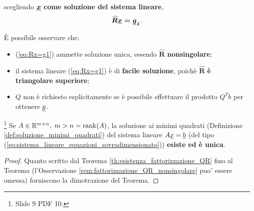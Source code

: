 \addtocounter{footnote}{-7}








\noindent scegliendo $\boldsymbol{\uline x}$ \textbf{come soluzione del sistema lineare},
\begin{equation}\label{eq:Rx=g1}
    \boldsymbol{\widehat R\uline x=\uline g_1}.
\end{equation}

È possibile osservare che:
\begin{itemize}
	\item (\ref{eq:Rx=g1}) ammette soluzione unica, essendo $\boldsymbol{\widehat R}$ \textbf{\gls{nonsingolare}};
	\item il sistema lineare (\ref{eq:Rx=g1}) è di \textbf{facile soluzione}, poichè $\boldsymbol{\widehat R}$ \textbf{è triangolare superiore};
	\item $Q$ non è richiesto esplicitamente se è possibile effettuare il prodotto $Q^Tb$ per ottenere $\uline g$.
\end{itemize}

\begin{theorem}\footnote{Slide 9 PDF 10.}
    Se $A\in\mathbb R^{m\times n},\; m>n=\operatorname{rank}(A)$, la soluzione ai minimi quadrati (Definizione \ref{def:soluzione_minimi_quadrati}) del sistema lineare $A\uline x=\uline b$ (del tipo (\ref{eq:sistema_lineare_equazioni_sovradimensionato})) \textbf{esiste ed è unica}.
\end{theorem}
\begin{proof}
    Quanto scritto dal Teorema \ref{th:esistenza_fattorizzazione_QR} fino al Teorema (l'Osservazione \ref{rem:fattorizzazione_QR_nonsingolare} puo' essere omessa) forniscono la dimotrazione del Teorema.
\end{proof}

